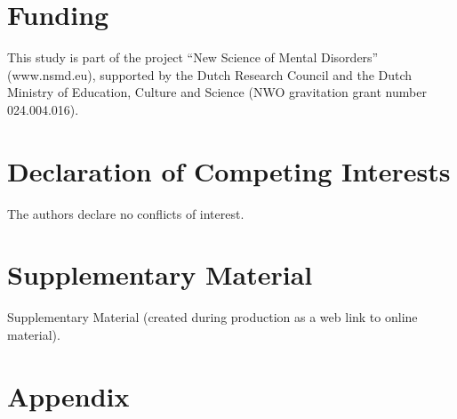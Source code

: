 \documentclass[]{imag-ms-template}
\begin{document}
\section*{Funding}

This study is part of the project “New Science of Mental Disorders” (www.nsmd.eu), supported by the Dutch Research Council and the Dutch Ministry of Education, Culture and Science (NWO gravitation grant number 024.004.016). 

\section*{Declaration of Competing Interests}

The authors declare no conflicts of interest.

%

\section*{Supplementary Material}

Supplementary Material (created during production as a web link to online material).

\nocite{*}
\printbibliography

\appendix

\section{Appendix}
\end{document}
